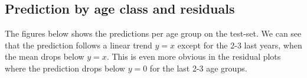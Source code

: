 \documentclass[10pt,letterpaper]{article}
\begin{document}
\subsection*{Prediction by age class and residuals}

The figures below shows the predictions per age group on the test-set. We
can see that the prediction follows a linear trend $y=x$ except for the 2-3 last years,
when the mean drops below $y=x$. This is even more obvious in the residual plots
where the prediction drops below $y=0$ for the last 2-3 age groups.


\begin{figure}
  \centering

  

\end{figure}
\end{document}
